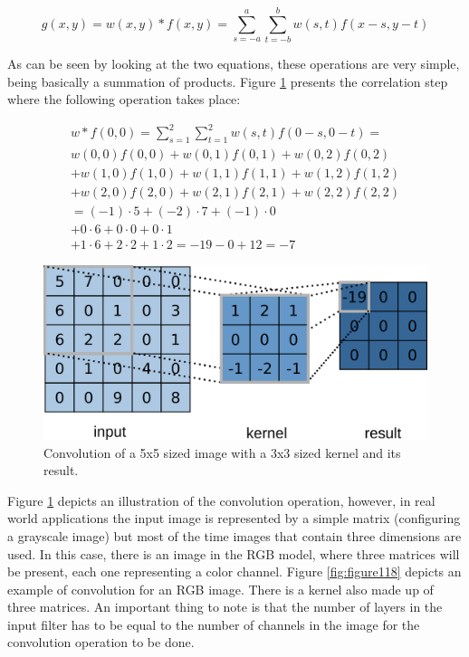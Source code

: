 \begin{equation}
g(x,y)=w(x,y)\ast f(x,y)=\sum_{s=-a}^a\sum_{t=-b}^bw(s,t)f(x-s,y-t)
\end{equation}

As can be seen by looking at the two equations, these operations are very simple, being basically a summation of products. Figure \ref{fig:figure117} presents the correlation step where the following operation takes place:

\begin{equation}
\begin{split}
w*f(0,0)=\sum_{s=1}^{2}\sum_{t=1}^{2}w(s,t){f}(0-s,0-t)= \\
w(0,0)f(0,0)+w(0,1)f(0,1)+w(0,2)f(0,2) \\
+w(1,0)f(1,0)+w(1,1)f(1,1)+w(1,2)f(1,2) \\
+w(2,0)f(2,0)+w(2,1)f(2,1)+w(2,2)f(2,2)\\
=(-1)\cdot5+(-2)\cdot7+(-1)\cdot0\\
+0\cdot6+0\cdot0+0\cdot1\\
+1\cdot6+2\cdot2+1\cdot2
=-19-0+12=-7
\end{split}
\end{equation}

\begin{figure}
    \centering
    \includegraphics[scale=0.40]{images/figure117.png}
    \caption{Convolution of a 5x5 sized image with a 3x3 sized kernel and its result.}
    \label{fig:figure117}
\end{figure}

Figure \ref{fig:figure117} depicts an illustration of the convolution operation, however, in real world applications the input image is represented by a simple matrix (configuring a grayscale image) but most of the time images that contain three dimensions are used. In this case, there is an image in the RGB model, where three matrices will be present, each one representing a color channel. Figure \ref{fig:figure118} depicts an example of convolution for an RGB image. There is a kernel also made up of three matrices. An important thing to note is that the number of layers in the input filter has to be equal to the number of channels in the image for the convolution operation to be done.

